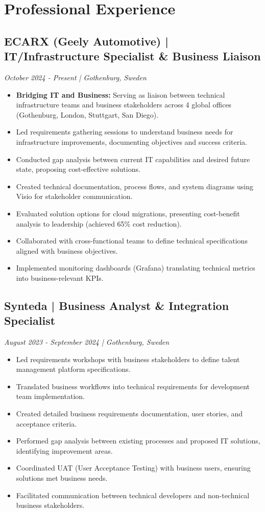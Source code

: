 \documentclass[10pt,a4paper]{article}
\begin{document}
\section*{Professional Experience}

\subsection*{ECARX (Geely Automotive) | IT/Infrastructure Specialist \& Business Liaison}
\textit{October 2024 - Present | Gothenburg, Sweden}
\begin{itemize}[noitemsep]
\item \textbf{Bridging IT and Business:} Serving as liaison between technical infrastructure teams and business stakeholders across 4 global offices (Gothenburg, London, Stuttgart, San Diego).
\item Led requirements gathering sessions to understand business needs for infrastructure improvements, documenting objectives and success criteria.
\item Conducted gap analysis between current IT capabilities and desired future state, proposing cost-effective solutions.
\item Created technical documentation, process flows, and system diagrams using Visio for stakeholder communication.
\item Evaluated solution options for cloud migrations, presenting cost-benefit analysis to leadership (achieved 65\% cost reduction).
\item Collaborated with cross-functional teams to define technical specifications aligned with business objectives.
\item Implemented monitoring dashboards (Grafana) translating technical metrics into business-relevant KPIs.
\end{itemize}

\subsection*{Synteda | Business Analyst \& Integration Specialist}
\textit{August 2023 - September 2024 | Gothenburg, Sweden}
\begin{itemize}[noitemsep]
\item Led requirements workshops with business stakeholders to define talent management platform specifications.
\item Translated business workflows into technical requirements for development team implementation.
\item Created detailed business requirements documentation, user stories, and acceptance criteria.
\item Performed gap analysis between existing processes and proposed IT solutions, identifying improvement areas.
\item Coordinated UAT (User Acceptance Testing) with business users, ensuring solutions met business needs.
\item Facilitated communication between technical developers and non-technical business stakeholders.
\end{itemize}
\end{document}
